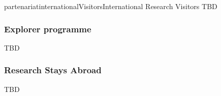 \documentclass{ra2016}
\begin{document}
\begin{module}{partenariat}{internationalVisitors}{International Research Visitors}
TBD


   \subsubsection{Explorer programme}

TBD


   \subsubsection{Research Stays Abroad}

TBD




\end{module}



\end{document}
